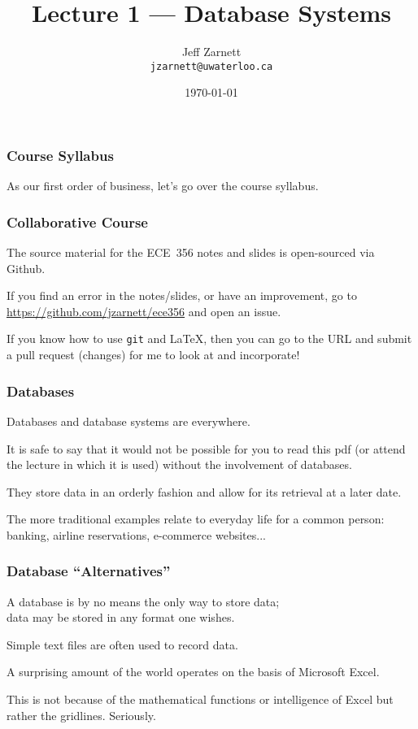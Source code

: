 

\title{Lecture 1 --- Database Systems}

\author{Jeff Zarnett \\ \small \texttt{jzarnett@uwaterloo.ca}}
\date{\today}




\begin{frame}
  \titlepage

 \end{frame}

\begin{frame}
\frametitle{Course Syllabus}

As our first order of business, let's go over the course syllabus.

\end{frame}

\begin{frame}
\frametitle{Collaborative Course}

The source material for the ECE~356 notes and slides is open-sourced via Github. 

If you find an error in the notes/slides, or have an improvement, go to \url{https://github.com/jzarnett/ece356} and open an issue. 

If you know how to use \texttt{git} and \LaTeX, then you can go to the URL and submit a pull request (changes) for me to look at and incorporate!


\end{frame}



\begin{frame}
\frametitle{Databases}

Databases and database systems are everywhere. 

It is safe to say that it would not be possible for you to read this pdf (or attend the lecture in which it is used) without the involvement of databases.

They store data in an orderly fashion and allow for its retrieval at a later date.

The more traditional examples relate to everyday life for a common person: banking, airline reservations, e-commerce websites...

\end{frame}



\begin{frame}
\frametitle{Database ``Alternatives''}
A database is by no means the only way to store data; \\
\quad data may be stored in any format one wishes. 

Simple text files are often used to record data. 

A surprising amount of the world operates on the basis of Microsoft Excel. 

This is not because of the mathematical functions or intelligence of Excel but rather the gridlines. Seriously.

\end{frame}



